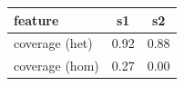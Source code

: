\documentclass{standalone}
\begin{document}
\begin{tabular}{|l|c|c|}
\toprule
\textbf{feature} & s1 & s2 \\
\midrule
coverage (het) & 0.92 & 0.88 \\
coverage (hom) & 0.27 & 0.00 \\
\bottomrule
\end{tabular}
\end{document}
